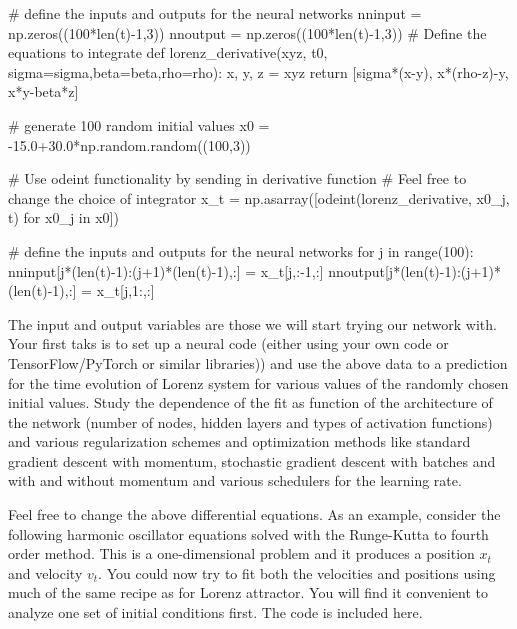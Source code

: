 \documentclass[%
oneside,                 %
final,                   %
10pt]{article}
\begin{document}
# define the inputs and outputs for the neural networks
nninput = np.zeros((100*len(t)-1,3))
nnoutput = np.zeros((100*len(t)-1,3))
# Define the equations to integrate
def lorenz_derivative(xyz, t0, sigma=sigma,beta=beta,rho=rho):
    x, y, z = xyz
    return [sigma*(x-y), x*(rho-z)-y, x*y-beta*z]

# generate 100 random initial values
x0 = -15.0+30.0*np.random.random((100,3))

# Use odeint functionality by sending in derivative function
# Feel free to change the choice of integrator
x_t = np.asarray([odeint(lorenz_derivative, x0_j, t) 
                  for x0_j in x0])

# define the inputs and outputs for the neural networks
for j in range(100):
    nninput[j*(len(t)-1):(j+1)*(len(t)-1),:] = x_t[j,:-1,:]
    nnoutput[j*(len(t)-1):(j+1)*(len(t)-1),:] = x_t[j,1:,:]


\epycod


The input and output variables are those we will start trying our
network with. Your first taks is to set up a neural code (either using
your own code or TensorFlow/PyTorch or similar libraries)) and use the
above data to a prediction for the time evolution of Lorenz system for
various values of the randomly chosen initial values.  Study the
dependence of the fit as function of the architecture of the network
(number of nodes, hidden layers and types of activation functions) and
various regularization schemes and optimization methods like standard
gradient descent with momentum, stochastic gradient descent with
batches and with and without momentum and various schedulers for the
learning rate.

Feel free to change the above differential equations. As an example,
consider the following harmonic oscillator equations solved with the
Runge-Kutta to fourth order method. This is a one-dimensional problem
and it produces a position $x_t$ and velocity $v_t$. You could now try
to fit both the velocities and positions using much of the same recipe
as for Lorenz attractor.  You will find it convenient to analyze one
set of initial conditions first. The code is included here.
\end{document}
